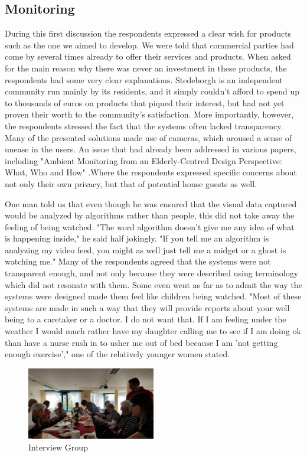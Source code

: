 \documentclass{below-ext}
\begin{document}
\subsection{Monitoring}
During this first discussion the respondents expressed a clear wish for products such as the one we aimed to develop. We were told that commercial parties had come by several times already to offer their services and products. When asked for the main reason why there was never an investment in these products, the respondents had some very clear explanations. Stedeborgh is an independent community run mainly by its residents, and it simply couldn't afford to spend up to thousands of euros on products that piqued their interest, but had not yet proven their worth to the community's satisfaction. More importantly, however, the respondents stressed the fact that the systems often lacked transparency. Many of the presented solutions made use of cameras, which aroused a sense of unease in the users. An issue that had already been addressed in various papers, including "Ambient Monitoring from an Elderly-Centred Design Perspective: What, Who and How" \cite{ambiantmonitoring}.Where the respondents expressed specific concerns about not only their own privacy, but that of potential house guests as well.

One man told us that even though he was ensured that the visual data captured would be analyzed by algorithms rather than people, this did not take away the feeling of being watched. "The word algorithm doesn't give me any idea of what is happening inside," he said half jokingly. "If you tell me an algorithm is analyzing my video feed, you might as well just tell me a midget or a ghost is watching me." Many of the respondents agreed that the systems were not transparent enough, and not only because they were described using terminology which did not resonate with them. Some even went as far as to admit the way the systems were designed made them feel like children being watched. %
"Most of these systems are made in such a way that they will provide reports about your well being to a caretaker or a doctor. I do not want that. If I am feeling under the weather I would much rather have my daughter calling me to see if I am doing ok than have a nurse rush in to usher me out of bed because I am 'not getting enough exercise'," one of the relatively younger women stated. 

\begin{figure}
\centering
\includegraphics[width=0.5\textwidth]{interview}
\caption{Interview Group}
\label{fig:interview}
\end{figure}
\end{document}

